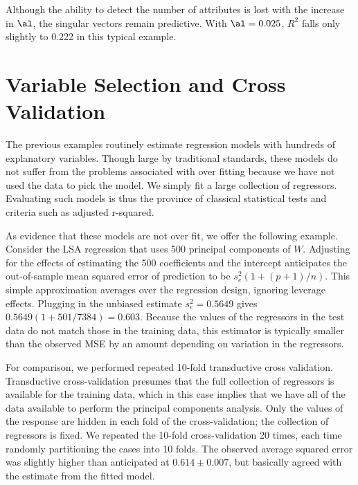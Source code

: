 \documentclass[12pt]{article}
\begin{document}
Although the ability to detect the number of attributes is lost with the increase in $\al$, the singular vectors remain predictive.  With $\al=0.025$, $R^2$ falls only slightly to 0.222 in this typical example.
 
\section{Variable Selection and Cross Validation}
\label{sec:cv}

The previous examples routinely estimate regression models with hundreds of explanatory variables.  Though large by traditional standards, these models do not suffer from the problems associated with over fitting because we have not used the data to pick the model.  We simply fit a large collection of regressors.  Evaluating such models is thus the province of classical statistical tests and criteria such as adjusted r-squared.  

As evidence that these models are not over fit, we offer the following example.  Consider the LSA regression that uses 500 principal components of $W$.  Adjusting for the effects of estimating the 500 coefficients and the intercept anticipates the out-of-sample mean squared error of prediction to be $s_e^2 (1+(p+1)/n)$.  This simple approximation averages over the regression design, ignoring leverage effects.  Plugging in the unbiased estimate $s_e^2 = 0.5649$ gives $0.5649 (1+501/7384) = 0.603$.  Because the values of the regressors in the test data do not match those in the training data, this estimator is typically smaller than the observed MSE by an amount depending on variation in the regressors.  

For comparison, we performed repeated 10-fold transductive cross validation.  Transductive cross-validation presumes that the full collection of regressors is available for the training data, which in this case implies that we have all of the data available to perform the principal components analysis.  Only the values of the response are hidden in each fold of the cross-validation; the collection of regressors is fixed.  We repeated the 10-fold cross-validation 20 times, each time randomly partitioning the cases into 10 folds. The observed average squared error was slightly higher than anticipated at $0.614 \pm 0.007$, but basically agreed with the estimate from the fitted model. 
\end{document}
